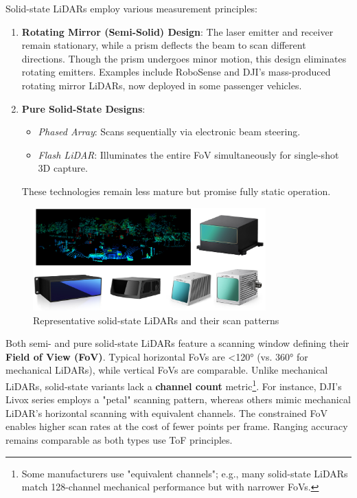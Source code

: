 Solid-state LiDARs employ various measurement principles:  
\begin{enumerate}  
	\item \textbf{Rotating Mirror (Semi-Solid) Design}: The laser emitter and receiver remain stationary, while a prism deflects the beam to scan different directions. Though the prism undergoes minor motion, this design eliminates rotating emitters. Examples include RoboSense and DJI's mass-produced rotating mirror LiDARs, now deployed in some passenger vehicles.  
	\item \textbf{Pure Solid-State Designs}:  
	\begin{itemize}  
		\item \textit{Phased Array}: Scans sequentially via electronic beam steering.  
		\item \textit{Flash LiDAR}: Illuminates the entire FoV simultaneously for single-shot 3D capture.  
	\end{itemize}  
	These technologies remain less mature but promise fully static operation.  
\end{enumerate}  

\begin{figure}[!t]  
	\centering  
	\includegraphics[width=0.8\textwidth]{resources/3d-lidar-mapping/solid-lidars.pdf}  
	\caption{Representative solid-state LiDARs and their scan patterns}  
	\label{fig:solid-lidars}  
\end{figure}  

Both semi- and pure solid-state LiDARs feature a scanning window defining their \textbf{Field of View (FoV)}. Typical horizontal FoVs are <120° (vs. 360° for mechanical LiDARs), while vertical FoVs are comparable. Unlike mechanical LiDARs, solid-state variants lack a \textbf{channel count} metric\footnote{Some manufacturers use "equivalent channels"; e.g., many solid-state LiDARs match 128-channel mechanical performance but with narrower FoVs.}. For instance, DJI's Livox series employs a "petal" scanning pattern, whereas others mimic mechanical LiDAR's horizontal scanning with equivalent channels. The constrained FoV enables higher scan rates at the cost of fewer points per frame. Ranging accuracy remains comparable as both types use ToF principles.  

